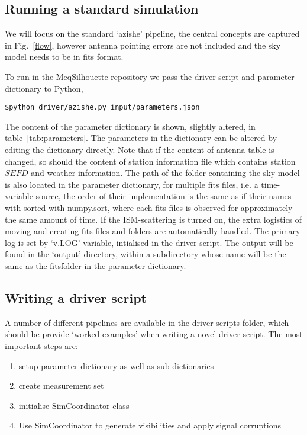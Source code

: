 \subsection{Running a standard simulation}

We will focus on the standard `azishe' pipeline, the central concepts are captured in Fig.~\ref{flow}, however antenna pointing errors are not included and the sky model needs to be in {\sc fits} format. 

To run in the MeqSilhouette repository we pass the driver script and parameter dictionary to {\sc Python},
\begin{verbatim}
$python driver/azishe.py input/parameters.json
\end{verbatim}


The content of the parameter dictionary is shown, slightly altered, in table~\ref{tab:parameters}. The parameters in the dictionary can be altered by editing the dictionary directly. Note that if the content of antenna table is changed, so should the content of station information file which contains station $SEFD$ and weather information. The path of the folder containing the sky model is also located in the parameter dictionary, for multiple fits files, i.e. a time-variable source, the order of their implementation is the same as if their names with sorted with numpy.sort, where each fits files is observed for approximately the same amount of time. If the ISM-scattering is turned on, the extra logistics of moving and creating fits files and folders are automatically handled. The primary log is set by `v.LOG' variable, intialised in the driver script. The output will be found in the `output' directory, within a subdirectory whose name will be the same as the fitsfolder in the parameter dictionary. 

\subsection{Writing a driver script}
 
A number of different pipelines are available in the driver scripts folder, which should be provide `worked examples' when writing a novel driver script. The most important steps are:
\begin{enumerate}
 \item setup parameter dictionary as well as sub-dictionaries
 \item create measurement set
 \item initialise SimCoordinator class
 \item Use SimCoordinator to generate visibilities and apply signal corruptions
\end{enumerate}

